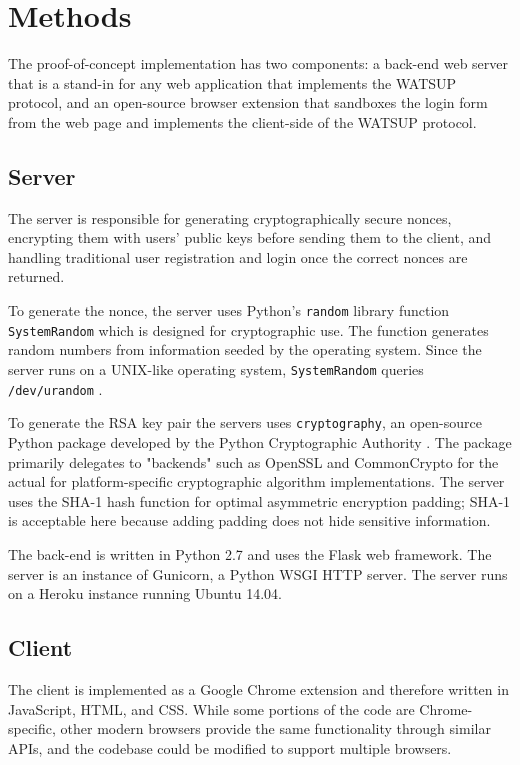 \section{Methods}
\label{sec:methods}

The proof-of-concept implementation has two components: a back-end web server that is a stand-in for any web application that implements the WATSUP protocol, and an open-source browser extension that sandboxes the login form from the web page and implements the client-side of the WATSUP protocol.

\subsection{Server}

The server is responsible for generating cryptographically secure nonces, encrypting them with users' public keys before sending them to the client, and handling traditional user registration and login once the correct nonces are returned.

To generate the nonce, the server uses Python's \texttt{random} library function \texttt{SystemRandom} which is designed for cryptographic use. The function generates random numbers from information seeded by the operating system. Since the server runs on a UNIX-like operating system, \texttt{SystemRandom} queries \texttt{/dev/urandom} \cite{Python:2017:SystemRandom, Python:2017:urandom}.

To generate the RSA key pair the servers uses \texttt{cryptography}, an open-source Python package developed by the Python Cryptographic Authority \cite{PCA:2017}. The package primarily delegates to "backends" such as OpenSSL and CommonCrypto for the actual for platform-specific cryptographic algorithm implementations. The server uses the SHA-1 hash function for optimal asymmetric encryption padding; SHA-1 is acceptable here because adding padding does not hide sensitive information.

The back-end is written in Python 2.7 and uses the Flask web framework. The server is an instance of Gunicorn, a Python WSGI HTTP server. The server runs on a Heroku instance running Ubuntu 14.04.

\subsection{Client}

The client is implemented as a Google Chrome extension and therefore written in JavaScript, HTML, and CSS. While some portions of the code are Chrome-specific, other modern browsers provide the same functionality through similar APIs, and the codebase could be modified to support multiple browsers.

